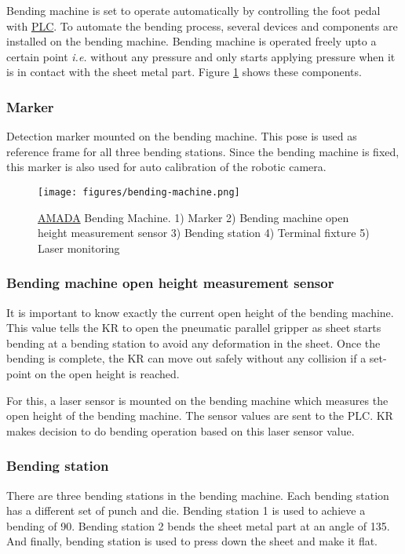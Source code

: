 Bending machine is set to operate automatically by controlling the foot pedal with \hyperref[acro:PLC]{PLC}.
To automate the bending process, several devices and components are installed on the bending machine.
Bending machine is operated freely upto a certain point \textit{i.e.} without any pressure and only starts
applying pressure when it is in contact with the sheet metal part.
Figure \ref{fig:bending_machine} shows these components.


\subsubsection{Marker}
\label{subsubsec:marker}
Detection marker mounted on the bending machine. This pose is used as reference frame for all three bending stations.
Since the bending machine is fixed, this marker is also used for auto calibration of the robotic camera.


\begin{figure}[h]
    \centering
    \texttt{[image: figures/bending-machine.png]}
    \caption{\hyperref[acro:AMADA]{AMADA} Bending Machine. 1) Marker  2) Bending machine open height measurement sensor 3) Bending station 4) Terminal fixture 5) Laser monitoring}
    \label{fig:bending_machine}
\end{figure}

\subsubsection{Bending machine open height measurement sensor}
\label{subsubsec:laser-sensor}

It is important to know exactly the current open height of the bending machine.
This value tells the KR to open the pneumatic parallel gripper as sheet starts bending at a bending station to avoid any deformation in the sheet.
Once the bending is complete, the KR can move out safely without any collision if a set-point on the open height is reached.

For this, a laser sensor is mounted on the bending machine which measures the open height of the bending machine.
The sensor values are sent to the PLC. KR makes decision to do bending operation based on this laser sensor value.


\subsubsection{Bending station}
\label{subsubsec:bending-station}
There are three bending stations in the bending machine. Each bending station has a different set of punch and die.
Bending station 1 is used to achieve a bending of 90\textdegree. Bending station 2 bends the sheet metal part at an angle of 135\textdegree.
And finally, bending station is used to press down the sheet and make it flat.

